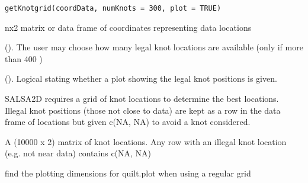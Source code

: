 \documentclass[a4paper]{book}
\begin{document}
%
\begin{Usage}
\begin{verbatim}
getKnotgrid(coordData, numKnots = 300, plot = TRUE)
\end{verbatim}
\end{Usage}
%
\begin{Arguments}
\begin{ldescription}
\item[\code{coordData}] nx2 matrix or data frame of coordinates representing data locations

\item[\code{numKnots}] ().  The user may choose how many legal knot locations are available (only if more than 400 )

\item[\code{plot}] (). Logical stating whether a plot showing the legal knot positions is given.
\end{ldescription}
\end{Arguments}
%
\begin{Details}\relax
SALSA2D requires a grid of knot locations to determine the best locations.  Illegal knot positions (those not close to data) are kept as a row in the data frame of locations but given c(NA, NA) to avoid a knot considered.
\end{Details}
%
\begin{Value}
A (10000 x 2) matrix of knot locations.  Any row with an illegal knot location (e.g. not near data) contains c(NA, NA)
\end{Value}
%
\begin{Examples}
\end{Examples}
%
\begin{Description}\relax
find the plotting dimensions for quilt.plot when using a regular grid
\end{Description}
\end{document}
